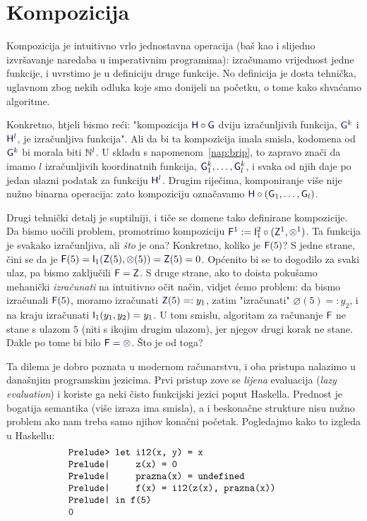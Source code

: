 \section{Kompozicija}

Kompozicija je intuitivno vrlo jednostavna operacija (baš kao i slijedno izvršavanje naredaba u imperativnim programima): izračunamo vrijednost jedne funkcije, i uvrstimo je u definiciju druge funkcije. No definicija je dosta tehnička, uglavnom zbog nekih odluka koje smo donijeli na početku, o tome kako shvaćamo algoritme.

Konkretno, htjeli bismo reći: "kompozicija $\f H\circ\f G$ dviju izračunljivih funkcija, $\f G^k$ i $\f H^l$, je izračunljiva funkcija". Ali da bi ta kompozicija imala smisla, kodomena od $\f G^k$ bi morala biti ${\mathbb N}^l$. U skladu s napomenom~\ref{nap:brip}, to zapravo znači da imamo $l$ izračunljivih koordinatnih funkcija, $\f G_1^k,\dotsc,\f G_l^k$, i svaka od njih daje po jedan ulazni podatak za funkciju $\f H^l$. Drugim riječima, komponiranje više nije nužno binarna operacija: zato kompoziciju označavamo $\f H\circ(\f G_1,\dotsc,\f G_l)$.

Drugi tehnički detalj je suptilniji, i tiče se domene tako definirane kompozicije. Da bismo uočili problem, promotrimo kompoziciju $\f F^1:=\f I_1^2\circ(\f Z^1,\varnothing^1)$. Ta funkcija je svakako izračunljiva, ali \emph{što} je ona? Konkretno, koliko je $\f F(5)$? S jedne strane, čini se da je $\f F(5)=\f I_1(\f Z(5),\varnothing(5))=\f Z(5)=0$. Općenito bi se to dogodilo za svaki ulaz, pa bismo zaključili $\f F =\f Z$. S druge strane, ako to doista pokušamo mehanički \emph{izračunati} na intuitivno očit način, vidjet ćemo problem: da bismo izračunali $\f F(5)$, moramo izračunati $\f Z(5)=:y_1$, zatim "izračunati" $\varnothing(5)=:y_2$, i na kraju izračunati $\f I_1(y_1,y_2)=y_1$. U tom smislu, algoritam za računanje $\f F$ ne stane s ulazom $5$ (niti s ikojim drugim ulazom), jer njegov drugi korak ne stane. Dakle po tome bi bilo $\f F=\varnothing$. Što je od toga?


Ta dilema je dobro poznata u modernom računarstvu, i oba pristupa nalazimo u današnjim programskim jezicima. Prvi pristup zove se \emph{lijena} evaluacija (\emph{lazy evaluation}) i koriste ga neki čisto funkcijski jezici poput Haskella. Prednost je bogatija semantika (više izraza ima smisla), a i beskonačne strukture nisu nužno problem ako nam treba samo njihov konačni početak. Pogledajmo kako to izgleda u Haskellu:
\begin{equation}\begin{minipage}{0.8\textwidth}
\begin{verbatim}
    Prelude> let i12(x, y) = x
    Prelude|     z(x) = 0
    Prelude|     prazna(x) = undefined
    Prelude|     f(x) = i12(z(x), prazna(x))
    Prelude| in f(5)
    0
\end{verbatim}
\end{minipage}\end{equation}

